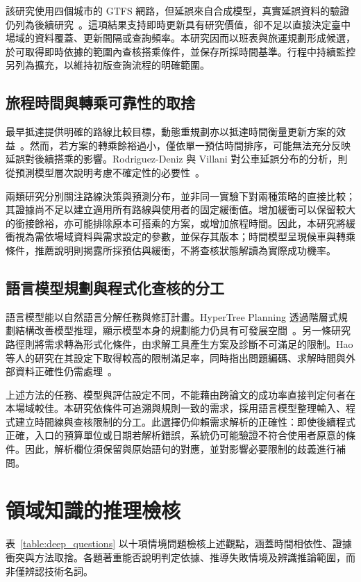 該研究使用四個城市的 GTFS 網路，但延誤來自合成模型，真實延誤資料的驗證仍列為後續研究~\cite{bus_dynamic_replanning}。這項結果支持即時更新具有研究價值，卻不足以直接決定臺中場域的資料覆蓋、更新間隔或查詢頻率。本研究因而以班表與旅運規劃形成候選，於可取得即時依據的範圍內查核搭乘條件，並保存所採時間基準。行程中持續監控另列為擴充，以維持初版查詢流程的明確範圍。

\subsection{旅程時間與轉乘可靠性的取捨}

最早抵達提供明確的路線比較目標，動態重規劃亦以抵達時間衡量更新方案的效益~\cite{bus_dynamic_replanning}。然而，若方案的轉乘餘裕過小，僅依單一預估時間排序，可能無法充分反映延誤對後續搭乘的影響。Rodriguez-Deniz 與 Villani 對公車延誤分布的分析，則從預測模型層次說明考慮不確定性的必要性~\cite{bus_delay_uncertainty}。

兩類研究分別關注路線決策與預測分布，並非同一實驗下對兩種策略的直接比較；其證據尚不足以建立適用所有路線與使用者的固定緩衝值。增加緩衝可以保留較大的銜接餘裕，亦可能排除原本可搭乘的方案，或增加旅程時間。因此，本研究將緩衝視為需依場域資料與需求設定的參數，並保存其版本；時間模型呈現候車與轉乘條件，推薦說明則揭露所採預估與緩衝，不將查核狀態解讀為實際成功機率。

\subsection{語言模型規劃與程式化查核的分工}

語言模型能以自然語言分解任務與修訂計畫。HyperTree Planning 透過階層式規劃結構改善模型推理，顯示模型本身的規劃能力仍具有可發展空間~\cite{hypertree_planning}。另一條研究路徑則將需求轉為形式化條件，由求解工具產生方案及診斷不可滿足的限制。Hao 等人的研究在其設定下取得較高的限制滿足率，同時指出問題編碼、求解時間與外部資料正確性仍需處理~\cite{llm_planning_tools}。

上述方法的任務、模型與評估設定不同，不能藉由跨論文的成功率直接判定何者在本場域較佳。本研究依條件可追溯與規則一致的需求，採用語言模型整理輸入、程式建立時間線與查核限制的分工。此選擇仍仰賴需求解析的正確性：即使後續程式正確，入口的預算單位或日期若解析錯誤，系統仍可能驗證不符合使用者原意的條件。因此，解析欄位須保留與原始語句的對應，並對影響必要限制的歧義進行補問。

\section{領域知識的推理檢核}

表~\ref{table:deep_questions} 以十項情境問題檢核上述觀點，涵蓋時間相依性、證據衝突與方法取捨。各題著重能否說明判定依據、推導失敗情境及辨識推論範圍，而非僅辨認技術名詞。


